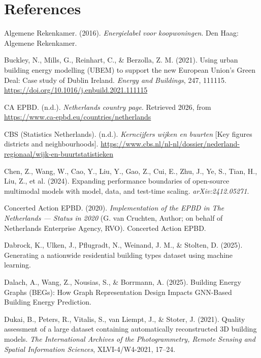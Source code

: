 \chapter*{References}
\begingroup\sloppy

\noindent \hypertarget{ref:algemene2016}{}Algemene Rekenkamer. (2016). \emph{Energielabel voor koopwoningen}. Den Haag: Algemene Rekenkamer.
\par\medskip
\noindent \hypertarget{ref:buckley2021}{}Buckley, N., Mills, G., Reinhart, C., \& Berzolla, Z. M. (2021). Using urban building energy modelling (UBEM) to support the new European Union's Green Deal: Case study of Dublin Ireland. \emph{Energy and Buildings}, 247, 111115. \url{https://doi.org/10.1016/j.enbuild.2021.111115}
\par\medskip
\noindent \hypertarget{ref:caepbd}{}CA EPBD. (n.d.). \emph{Netherlands country page}. Retrieved 2026, from \url{https://www.ca-epbd.eu/countries/netherlands}
\par\medskip
\noindent \hypertarget{ref:cbs}{}CBS (Statistics Netherlands). (n.d.). \emph{Kerncijfers wijken en buurten} [Key figures districts and neighbourhoods]. \url{https://www.cbs.nl/nl-nl/dossier/nederland-regionaal/wijk-en-buurtstatistieken}
\par\medskip
\noindent \hypertarget{ref:chen2024}{}Chen, Z., Wang, W., Cao, Y., Liu, Y., Gao, Z., Cui, E., Zhu, J., Ye, S., Tian, H., Liu, Z., et al. (2024). Expanding performance boundaries of open-source multimodal models with model, data, and test-time scaling. \emph{arXiv:2412.05271}.
\par\medskip
\noindent \hypertarget{ref:caepbd2020}{}Concerted Action EPBD. (2020). \emph{Implementation of the EPBD in The Netherlands --- Status in 2020} (G. van Cruchten, Author; on behalf of Netherlands Enterprise Agency, RVO). Concerted Action EPBD.
\par\medskip
\noindent \hypertarget{ref:dabrock2025}{}Dabrock, K., Ulken, J., Pflugradt, N., Weinand, J. M., \& Stolten, D. (2025). Generating a nationwide residential building types dataset using machine learning.
\par\medskip
\noindent \hypertarget{ref:dalach2025}{}Dalach, A., Wang, Z., Nousias, S., \& Borrmann, A. (2025). Building Energy Graphs (BEGs): How Graph Representation Design Impacts GNN-Based Building Energy Prediction.
\par\medskip
\noindent \hypertarget{ref:dukai2021}{}Dukai, B., Peters, R., Vitalis, S., van Liempt, J., \& Stoter, J. (2021). Quality assessment of a large dataset containing automatically reconstructed 3D building models. \emph{The International Archives of the Photogrammetry, Remote Sensing and Spatial Information Sciences}, XLVI-4/W4-2021, 17--24.
